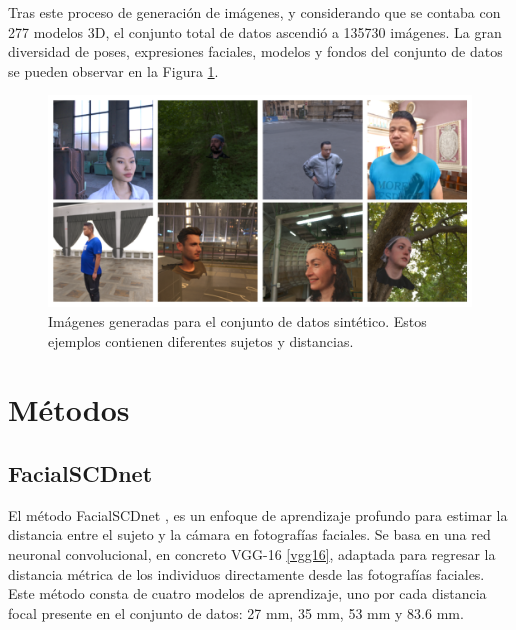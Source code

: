 Tras este proceso de generación de imágenes, y considerando que se contaba con 277 modelos 3D, el conjunto total de datos ascendió a 135730 imágenes. La gran diversidad de poses, expresiones faciales, modelos y fondos del conjunto de datos se pueden observar en la Figura \ref{fig24}.


\begin{figure}[h]
	\centering
	\includegraphics[scale=0.4]{imagenes/cap4/ejemplos_dataset.png}
	\caption[Ejemplos de imágenes generadas para el conjunto de datos.]{Imágenes generadas para el conjunto de datos sintético. Estos ejemplos contienen diferentes sujetos y distancias.}
	\label{fig24}
\end{figure}

\section{Métodos}


\subsection{FacialSCDnet}\label{fscdnet}

El método FacialSCDnet \cite{14}, es un enfoque de aprendizaje profundo para estimar la distancia entre el sujeto y la cámara en fotografías faciales. Se basa en una red neuronal convolucional, en concreto VGG-16 \ref{vgg16}, adaptada para regresar la distancia métrica de los individuos directamente desde las fotografías faciales. Este método consta de cuatro modelos de aprendizaje, uno por cada distancia focal presente en el conjunto de datos: 27 mm, 35 mm, 53 mm y 83.6 mm.

